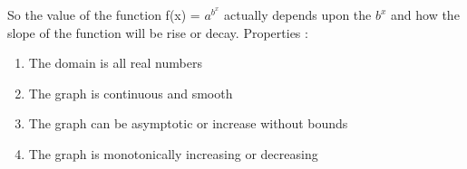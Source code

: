 \documentclass[a4paper, 11pt]{article}
\begin{document}
So the value of the function f(x) = $a^{b^{x}}$ actually depends upon the $b^x$  and how the slope of the function will be rise or decay. \newline
Properties : 
\begin{enumerate}
    \item The domain is all real numbers
    \item The graph is continuous and smooth
    \item The graph can be asymptotic or increase without bounds
    \item The graph is monotonically increasing or decreasing
\end{enumerate}
\end{document}
